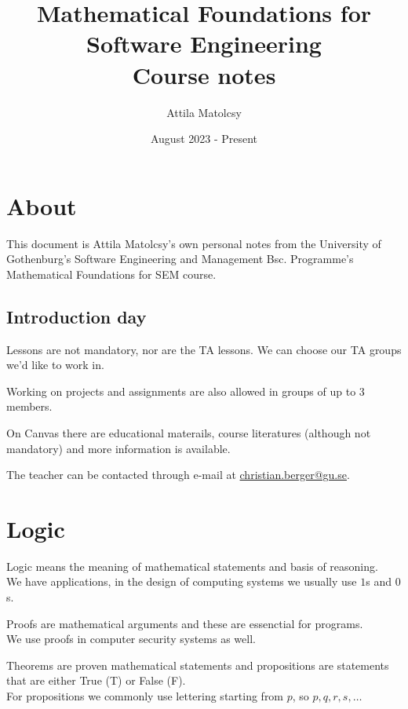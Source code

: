 \documentclass{article}
\title{Mathematical Foundations for Software Engineering \\[1ex] \large Course notes}
\author{Attila Matolcsy}
\date{\nth{25} August 2023 - Present}
\let\stdsection\section
\renewcommand\section{\newpage\stdsection}
\begin{document}
\maketitle

\tableofcontents

\section{About}
This document is Attila Matolcsy's own personal notes from the University of Gothenburg's Software Engineering and Management Bsc. Programme's Mathematical Foundations for SEM course.

\subsection*{Introduction day}
Lessons are not mandatory, nor are the TA lessons. We can choose our TA groups we'd like to work in.

Working on projects and assignments are also allowed in groups of up to 3 members.

On Canvas there are educational materails, course literatures (although not mandatory) and more information is available.

The teacher can be contacted through e-mail at \href{mailto:christian.berger@gu.se}{christian.berger@gu.se}.


\section{Logic}

Logic means the meaning of mathematical statements and basis of reasoning.\\
We have applications, in the design of computing systems we usually use $1$s and $0$s.

Proofs are mathematical arguments and these are essenctial for programs.\\
We use proofs in computer security systems as well.

Theorems are proven mathematical statements and propositions are statements that are either True (T) or False (F).\\
For propositions we commonly use lettering starting from $p$, so $p,q,r,s,\dots$
\end{document}
